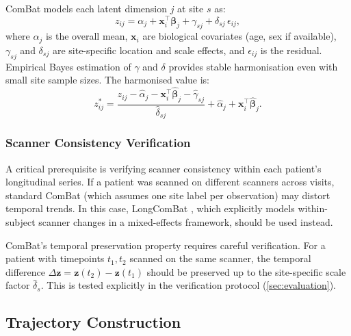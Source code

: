 ComBat models each latent dimension $j$ at site $s$ as:
\begin{equation}
  z_{ij} = \alpha_j + \mathbf{x}_i^\top \boldsymbol{\beta}_j
    + \gamma_{sj} + \delta_{sj}\,\epsilon_{ij},
  \label{eq:combat}
\end{equation}
where $\alpha_j$ is the overall mean, $\mathbf{x}_i$ are biological
covariates (age, sex if available), $\gamma_{sj}$ and $\delta_{sj}$ are
site-specific location and scale effects, and $\epsilon_{ij}$ is the
residual. Empirical Bayes estimation of $\gamma$ and $\delta$ provides
stable harmonisation even with small site sample sizes. The harmonised
value is:
\begin{equation}
  z_{ij}^* = \frac{z_{ij} - \hat{\alpha}_j - \mathbf{x}_i^\top
    \hat{\boldsymbol{\beta}}_j - \hat{\gamma}_{sj}}
    {\hat{\delta}_{sj}} + \hat{\alpha}_j
    + \mathbf{x}_i^\top\hat{\boldsymbol{\beta}}_j.
  \label{eq:combat_corrected}
\end{equation}

\subsubsection{Scanner Consistency Verification}

A critical prerequisite is verifying scanner consistency within each patient's
longitudinal series. If a patient was scanned on different scanners across
visits, standard ComBat (which assumes one site label per observation) may
distort temporal trends. In this case, LongComBat \cite{beer2020longcombat},
which explicitly models within-subject scanner changes in a mixed-effects
framework, should be used instead.

\begin{remark}
  ComBat's temporal preservation property requires careful verification.
  For a patient with timepoints $t_1, t_2$ scanned on the same scanner,
  the temporal difference $\Delta\mathbf{z} = \mathbf{z}(t_2) - \mathbf{z}(t_1)$
  should be preserved up to the site-specific scale factor $\hat{\delta}_s$.
  This is tested explicitly in the verification protocol (\cref{sec:evaluation}).
\end{remark}

\subsection{Trajectory Construction}
\label{sec:enc:trajectories}

